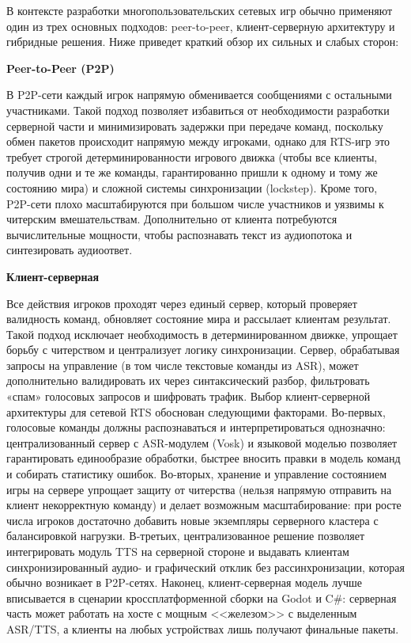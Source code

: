         В контексте разработки многопользовательских сетевых игр обычно применяют один из трех основных подходов: peer-to-peer, клиент-серверную архитектуру и гибридные решения. Ниже приведет краткий 
        обзор их сильных и слабых сторон:

        \textbf{Peer-to-Peer (P2P)}

        В P2P-сети каждый игрок напрямую обменивается сообщениями с остальными участниками. Такой подход позволяет избавиться от необходимости разработки серверной части 
        и минимизировать задержки при передаче команд, поскольку обмен пакетов происходит напрямую между игроками, однако для RTS-игр это требует строгой детерминированности игрового 
        движка (чтобы все клиенты, получив одни и те же команды, гарантированно пришли к одному и тому же состоянию мира) и сложной системы синхронизации (lockstep). Кроме того, 
        P2P-сети плохо масштабируются при большом числе участников и уязвимы к читерским вмешательствам. Дополнительно от клиента потребуются вычислительные мощности, чтобы распознавать текст
        из аудиопотока и синтезировать аудиоответ.
        
        \textbf{Клиент-серверная}

        Все действия игроков проходят через единый сервер, который проверяет валидность команд, обновляет состояние мира и рассылает клиентам результат. 
        Такой подход исключает необходимость в детерминированном движке, упрощает борьбу с читерством и централизует логику синхронизации. Сервер, обрабатывая запросы на управление 
        (в том числе текстовые команды из ASR), может дополнительно валидировать их через синтаксический разбор, фильтровать «спам» голосовых запросов и шифровать трафик. Выбор 
        клиент-серверной архитектуры для сетевой RTS обоснован следующими факторами. Во-первых, голосовые команды должны распознаваться и интерпретироваться однозначно: централизованный 
        сервер с ASR-модулем (Vosk) и языковой моделью позволяет гарантировать единообразие обработки, быстрее вносить правки в модель команд и собирать статистику ошибок. Во-вторых, хранение 
        и управление состоянием игры на сервере упрощает защиту от читерства (нельзя напрямую отправить на клиент некорректную команду) и делает возможным масштабирование: при росте числа игроков 
        достаточно добавить новые экземпляры серверного кластера с балансировкой нагрузки. В-третьих, централизованное решение позволяет интегрировать модуль TTS на серверной стороне 
        и выдавать клиентам синхронизированный аудио- и графический отклик без рассинхронизации, которая обычно возникает в P2P-сетях. Наконец, клиент-серверная модель лучше вписывается 
        в сценарии кроссплатформенной сборки на Godot и C\#: серверная часть может работать на хосте с мощным <<железом>> с выделенным ASR/TTS, а клиенты на любых устройствах лишь получают 
        финальные пакеты.
        
